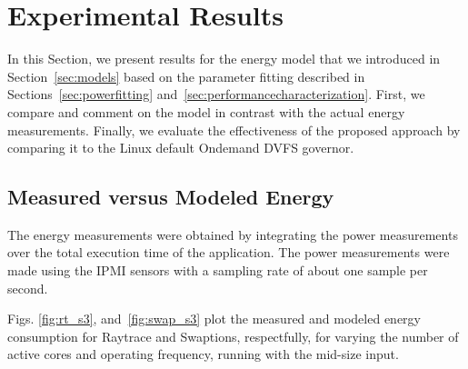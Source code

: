 \section{Experimental Results} \label{sec:experimentsresults}
In this Section, we present results for the energy model that we introduced in Section~\ref{sec:models} based on the parameter fitting described in Sections~\ref{sec:powerfitting} and~\ref{sec:performancecharacterization}. First, we compare and comment on the model in contrast with the actual energy measurements. Finally, we evaluate the effectiveness of the proposed approach by comparing it to the Linux default Ondemand DVFS governor.

\subsection{Measured versus Modeled Energy} \label{sec:measuredversusmodeledenergy}
The energy measurements were obtained by integrating the power measurements over the total execution time of the application.
The power measurements were made using the IPMI sensors with a sampling rate of about one sample per second.

Figs. \ref{fig:rt_s3}, and~\ref{fig:swap_s3}
plot the measured and modeled energy consumption for Raytrace and Swaptions, respectfully, for varying the number of active cores and operating frequency, running with the mid-size input.


